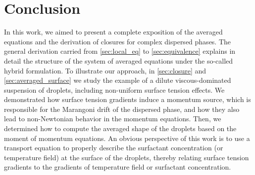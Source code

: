 \section{Conclusion}
\label{sec:conclusion}




In this work, we aimed to present a complete exposition of the averaged equations and the derivation of closures for complex dispersed phases. 
The general derivation carried from \ref{sec:local_eq} to \ref{sec:equivalence} explains in detail the structure of the system of averaged equations under the so-called hybrid formulation.  
To illustrate our approach, in \ref{sec:closure} and \ref{sec:averaged_surface} we study the example of a dilute viscous-dominated suspension of droplets, including non-uniform surface tension effects. 
We demonstrated how surface tension gradients induce a momentum source, which is responsible for the Marangoni drift of the dispersed phase, and how they also lead to non-Newtonian behavior in the momentum equations. 
Then, we determined how to compute the averaged shape of the droplets based on the moment of momentum equations. 
An obvious perspective of this work is to use a transport equation to properly describe the surfactant concentration (or temperature field) at the surface of the droplets, thereby relating surface tension gradients to the gradients of temperature field or surfactant concentration.  


